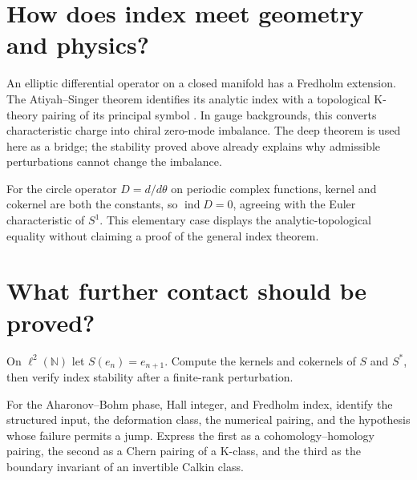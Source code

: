 \section{How does index meet geometry and physics?}

An elliptic differential operator on a closed manifold has a Fredholm
extension.  The Atiyah--Singer theorem identifies its analytic index with a
topological K-theory pairing of its principal symbol \cite{atiyah-singer}.
In gauge backgrounds,
this converts characteristic charge into chiral zero-mode imbalance.  The
deep theorem is used here as a bridge; the stability proved above already
explains why admissible perturbations cannot change the imbalance.

For the circle operator $D=d/d\theta$ on periodic complex functions, kernel
and cokernel are both the constants, so $\operatorname{ind}D=0$, agreeing
with the Euler characteristic of $S^1$.  This elementary case displays the
analytic-topological equality without claiming a proof of the general index
theorem.

\section{What further contact should be proved?}

\begin{exercise}
On $\ell^2(\mathbb N)$ let $S(e_n)=e_{n+1}$.  Compute the kernels and
cokernels of $S$ and $S^*$, then verify index stability after a finite-rank
perturbation.
\end{exercise}

\begin{exercise}
For the Aharonov--Bohm phase, Hall integer, and Fredholm index, identify the
structured input, the deformation class, the numerical pairing, and the
hypothesis whose failure permits a jump.  Express the first as a
cohomology--homology pairing, the second as a Chern pairing of a K-class, and
the third as the boundary invariant of an invertible Calkin class.
\end{exercise}

